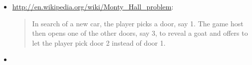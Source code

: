 \documentclass{beamer}
\begin{document}
\begin{itemize}
  \item
  \href{http://en.wikipedia.org/wiki/Monty_Hall_problem}{http://en.wikipedia.org/wiki/Monty\_Hall\_problem}:
  
  \begin{quotation}
    In search of a new car, the player picks a door, say 1. The game host then
    opens one of the other doors, say 3, to reveal a goat and offers to let
    the player pick door 2 instead of door 1.
    
  \end{quotation}
  
  \item {}{}{\hlopt{(}}{}{\hlopt{:
  }}{}{\hlopt{) = }}{}{\hlendline{}}\\
  {\hlstd{ \ }}{}{}{\hlendline{}}\\
  {\hlstd{ \ }}{}{}{\hlopt{= }}{}{\hlopt{\textbar }}{}{\hlopt{\textbar
  }}{}{\hlendline{}}\\
  {\hlstd{ \ }}{}{}{\hlopt{= [}}{}{\hlopt{;
  }}{}{\hlopt{; }}{}{\hlopt{]}}{\hlendline{}}
  
  {}{}{\hlopt{=
  }}{}{\hlendline{}}\\
  {}{\hlopt{<-- }}{}{\hlopt{;}}{\hlendline{}}\\
  {}{\hlopt{<-- }}{}{\hlopt{;}}{\hlendline{}}\\
  {}{\hlopt{<-- }}{}{\hlopt{(}}{}{\hlopt{[}}{}{\hlopt{;
  }}{}{\hlopt{]);}}{\hlendline{}}\\
  {\hlstd{ \ \ \ \ \ }}{}{}{\hlopt{=}}{\hlendline{}}\\
  {\hlstd{ \ \ \ \ \ \ \ }}{}{}{}{}{}{}{\hlopt{(}}{}{\hlopt{[}}{}{\hlopt{;
  }}{}{\hlopt{])}}{\hlendline{}}\\
  {\hlstd{ \ \ \ \ \ \ \ }}{}{}{}{\hlendline{}}\\
  {}{\hlopt{(}}{}{\hlopt{=
  }}{}{\hlopt{)}}{\hlendline{}}\\
  {}{\hlendline{}}
  

\end{itemize}
\end{document}
